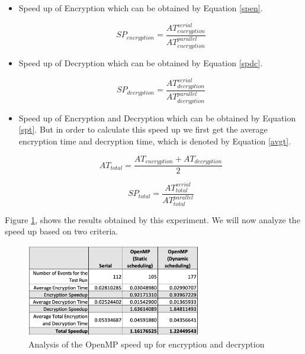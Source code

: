 \documentclass[conference]{IEEEtran}
\begin{document}
	\begin{itemize}
		\item Speed up of Encryption which can be obtained by Equation \ref{spen}.
		
		\begin{equation}
		SP_{encryption} = \frac{AT_{encryption}^{serial}}{AT_{encryption}^{parallel}}
		\label{spen}
		\end{equation}
		
		\item Speed up of Decryption which can be obtained by Equation \ref{spdc}.
		
			\begin{equation}
		SP_{decryption} = \frac{AT_{decryption}^{serial}}{AT_{decryption}^{parallel}}
		\label{spdc}
		\end{equation}
		
		
		\item Speed up of Encryption and Decryption which can be obtained by Equation \ref{spt}. But in order to calculate this speed up we first get the average encryption time and decryption time, which is denoted by Equation \ref{avgt}.
		
		\begin{equation}
		AT_{total} = \frac{AT_{encryption} + AT_{decryption}}{2}
		\label{avgt}
		\end{equation}
		
		\begin{equation}
		SP_{total} = \frac{AT_{total}^{serial}}{AT_{total}^{parallel}}
		\label{spt}
		\end{equation}
		
	\end{itemize}
	
	Figure \ref{speedup}, shows the results obtained by this experiment. We will now analyze the speed up based on two criteria.
		
		 \begin{figure}[!h]
		\centering
		\includegraphics[width=3in,keepaspectratio]{speed}
		\caption{Analysis of the OpenMP speed up for encryption and decryption}
		\label{speedup}
	\end{figure}
	
\end{document}
